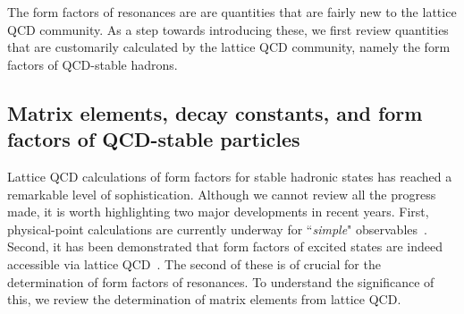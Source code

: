 \documentclass{iopart}
\theoremstyle{definition}
\begin{document}
{The form factors of resonances are are quantities that are fairly new to the lattice QCD community. As a step towards introducing these, we first review quantities that are customarily calculated by the lattice QCD community, namely the form factors of QCD-stable hadrons. 

\subsection{Matrix elements, decay constants, and form factors of QCD-stable particles\label{sec:ff_stable}}
Lattice QCD calculations of form factors for stable hadronic states has reached a remarkable level of sophistication. Although we cannot review all the progress made, it is worth highlighting two major developments in recent years. First, physical-point calculations are currently underway for ``\emph{simple}" observables~\cite{Abdel-Rehim:2016won, Green:2014xba, Owen:2015gva}. Second, it has been demonstrated that form factors of excited states are indeed accessible via lattice QCD~\cite{Shultz:2015pfa}. The second of these is of crucial for the determination of form factors of resonances. To understand the significance of this, we review the determination of matrix elements from lattice QCD. 

}
\end{document}

